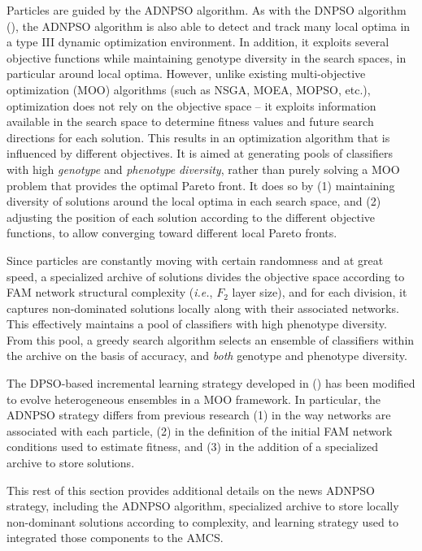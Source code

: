 Particles are guided by the ADNPSO algorithm.
As with the DNPSO algorithm (\cite{nickabadi08_1}), the ADNPSO algorithm is also able to detect and track many local optima in a type III dynamic optimization environment.
In addition, it exploits several objective functions while maintaining genotype diversity in the search spaces, in particular around local optima.
However, unlike existing multi-objective optimization (MOO) algorithms (such as NSGA, MOEA, MOPSO, etc.), optimization does not rely on the objective space --
it exploits information available in the search space to determine fitness values and future search directions for each solution.
This results in an optimization algorithm that is influenced by different objectives.
It is aimed at generating pools of classifiers with high \emph{genotype} and \emph{phenotype} \emph{diversity}, rather than purely solving a MOO problem that provides the optimal Pareto front.
It does so by (1) maintaining diversity of solutions around the local optima in each search space, and (2) adjusting the position of each solution according to the different objective functions, to allow converging toward different local Pareto fronts.

Since particles are constantly moving with certain randomness and at great speed, a specialized archive of solutions divides the objective space according to FAM network structural complexity (\emph{i.e.}, $F_2$ layer size), and for each division, it captures non-dominated solutions locally along with their associated networks.
This effectively maintains a pool of classifiers with high phenotype diversity.
From this pool, a greedy search algorithm selects an ensemble of classifiers within the archive on the basis of accuracy, and \emph{both} genotype and phenotype diversity.

The DPSO-based incremental learning strategy developed in (\cite{connolly11}) has been modified to evolve heterogeneous ensembles in a MOO framework.
In particular, the ADNPSO strategy differs from previous research (1) in the way  networks are associated with each particle, (2) in the definition of the initial FAM network conditions used to estimate fitness, and (3) in the addition of a specialized archive to store solutions.

This rest of this section provides additional details on the news ADNPSO strategy, including the ADNPSO algorithm, specialized archive to store locally non-dominant solutions according to complexity, and learning strategy used to integrated those components to the AMCS.

